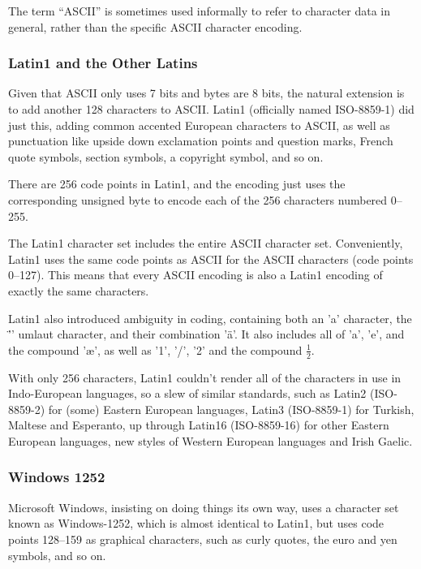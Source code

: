 The term ``ASCII'' is sometimes used informally to refer to character
data in general, rather than the specific ASCII character encoding.

\subsubsection{Latin1 and the Other Latins}\label{section:latin1}

Given that ASCII only uses 7 bits and bytes are 8 bits, the natural
extension is to add another 128 characters to ASCII.  Latin1
(officially named ISO-8859-1) did just this, adding common accented
European characters to ASCII, as well as punctuation like upside down
exclamation points and question marks, French quote symbols, section
symbols, a copyright symbol, and so on.  

There are 256 code points in Latin1, and the encoding just uses the
corresponding unsigned byte to encode each of the 256 characters
numbered 0--255.

The Latin1 character set includes the entire ASCII character set.
Conveniently, Latin1 uses the same code points as ASCII for the ASCII
characters (code points 0--127).  This means that every ASCII encoding
is also a Latin1 encoding of exactly the same characters.

Latin1 also introduced ambiguity in coding, containing both an 'a'
character, the '\"{}' umlaut character, and their combination '\"{a}'.
It also includes all of 'a', 'e', and the compound '\ae', as well as
'1', '/', '2' and the compound $\frac{1}{2}$.

With only 256 characters, Latin1 couldn't render all of the characters
in use in Indo-European languages, so a slew of similar standards,
such as Latin2 (ISO-8859-2) for (some) Eastern European languages,
Latin3 (ISO-8859-1) for Turkish, Maltese and Esperanto, up through
Latin16 (ISO-8859-16) for other Eastern European languages, new styles
of Western European languages and Irish Gaelic.  

\subsubsection{Windows 1252}

Microsoft Windows, insisting on doing things its own way, uses a
character set known as Windows-1252, which is almost identical to Latin1,
but uses code points 128--159 as graphical characters, such as curly
quotes, the euro and yen symbols, and so on.

